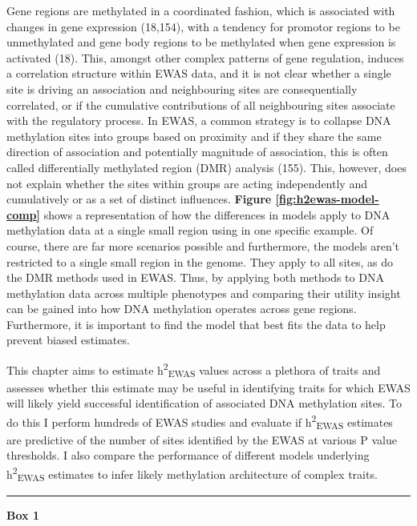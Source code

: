 \documentclass[11pt,oneside]{bristolthesis}
\begin{document}
Gene regions are methylated in a coordinated fashion, which is associated with changes in gene expression (18,154), with a tendency for promotor regions to be unmethylated and gene body regions to be methylated when gene expression is activated (18). This, amongst other complex patterns of gene regulation, induces a correlation structure within EWAS data, and it is not clear whether a single site is driving an association and neighbouring sites are consequentially correlated, or if the cumulative contributions of all neighbouring sites associate with the regulatory process. In EWAS, a common strategy is to collapse DNA methylation sites into groups based on proximity and if they share the same direction of association and potentially magnitude of association, this is often called differentially methylated region (DMR) analysis (155). This, however, does not explain whether the sites within groups are acting independently and cumulatively or as a set of distinct influences. \textbf{Figure \ref{fig:h2ewas-model-comp}} shows a representation of how the differences in models apply to DNA methylation data at a single small region using in one specific example. Of course, there are far more scenarios possible and furthermore, the models aren't restricted to a single small region in the genome. They apply to all sites, as do the DMR methods used in EWAS. Thus, by applying both methods to DNA methylation data across multiple phenotypes and comparing their utility insight can be gained into how DNA methylation operates across gene regions. Furthermore, it is important to find the model that best fits the data to help prevent biased estimates.

This chapter aims to estimate h\textsuperscript{2}\textsubscript{EWAS} values across a plethora of traits and assesses whether this estimate may be useful in identifying traits for which EWAS will likely yield successful identification of associated DNA methylation sites. To do this I perform hundreds of EWAS studies and evaluate if h\textsuperscript{2}\textsubscript{EWAS} estimates are predictive of the number of sites identified by the EWAS at various P value thresholds. I also compare the performance of different models underlying h\textsuperscript{2}\textsubscript{EWAS} estimates to infer likely methylation architecture of complex traits.
\begin{center}\rule{0.5\linewidth}{0.5pt}\end{center}

\textbf{Box 1}
\end{document}
